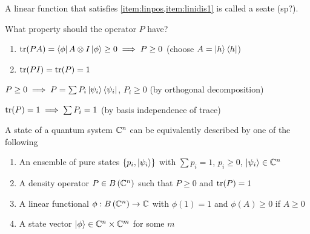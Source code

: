 A linear function that satisfies \cref{item:linpos,item:linidis1} is called a seate (sp?).

What property should the operator $P$ have?

\begin{enumerate}[label=\arabic*)]
    \item $\operatorname{tr}(PA) = \left\langle \phi\right|A\otimes I\left|\phi\right\rangle \geq 0 \implies P \geq 0$ (choose $A = \left|h\right\rangle\left\langle h\right|$)
    \item $\operatorname{tr}(PI) = \operatorname{tr}(P) = 1$
\end{enumerate}

$P \geq 0 \implies P = \sum P_i\left|\psi_i\right\rangle\left\langle \psi_i\right|$, $P_i\geq 0$ (by orthogonal decomposition)

$\operatorname{tr}(P) = 1 \implies \sum P_i = 1$ (by basis independence of trace)

A state of a quantum system $\mathbb{C}^n$ can be equivalently described by one of the following

\begin{enumerate}[label=\protect\cir{\arabic*}]
    \item An ensemble of pure states $\left\lbrace p_i, \left|\psi_i\right\rangle\right\rbrace$ with $\sum p_i = 1$, $p_i \geq 0$, $\left|\psi_i\right\rangle \in \mathbb{C}^n$
    \item A density operator $P \in B\left(\mathbb{C}^n\right)$ such that $P \geq 0$ and $\operatorname{tr}(P) = 1$
    \item A linear functional $\phi:B\left(\mathbb{C}^n\right) \to \mathbb{C}$ with $\phi(1) = 1$ and $\phi(A) \geq 0$ if $A \geq 0$
    \item A state vector $\left|\phi\right\rangle \in \mathbb{C}^n \times \mathbb{C}^m$ for some $m$
\end{enumerate}


